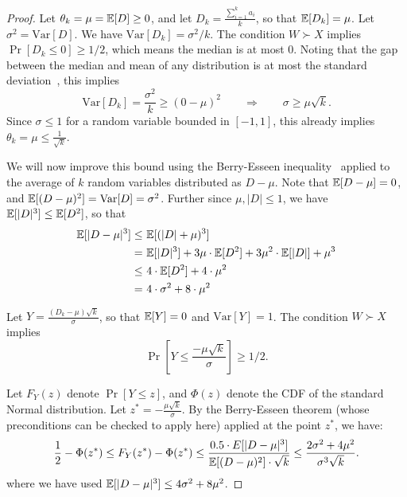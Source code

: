 \begin{proof}
Let $\theta_k = \mu = \mathbb{E}[D] \ge 0$, and let $D_k = \frac{\sum_{i=1}^k a_i}{k}$, so that $\mathbb{E}[D_k] = \mu$. Let $\sigma^2 = \mbox{Var}[D]$.  We have $\mbox{Var}[D_k] = \sigma^2/k$. The condition $W \succ X$ implies $\Pr[D_k \le 0] \ge 1/2$, which means the median is at most $0$. Noting that the gap between the median and mean of any distribution is at most the standard deviation~\cite{MU}, this implies %
$$\mbox{Var}[D_k] = \frac{\sigma^2}{k} \ge (0 - \mu)^2  \qquad \Rightarrow \qquad \sigma \ge \mu \sqrt{k}.$$
Since $\sigma \le 1$ for a random variable bounded in $[-1,1]$, this already implies $\theta_k = \mu \le \frac{1}{\sqrt{k}}$. 

We will now improve this bound using the Berry-Esseen inequality~\cite{feller1971introduction} applied to the average of $k$ random variables distributed as $D - \mu$. Note that $\mathbb{E}[D-\mu] = 0$, and $\mathbb{E}[(D-\mu)^2] = \mbox{Var}[D]= \sigma^2$. Further since $\mu, |D| \le 1$, we have $\mathbb{E}[|D|^3] \le \mathbb{E}[D^2]$, so that
 \begin{align*}
    \mathbb{E}[|D-\mu|^3]  \le & \ \mathbb{E}[(|D| + \mu)^3] \\
     = &\  \mathbb{E}[|D|^3] + 3 \mu \cdot \mathbb{E}[D^2] + 3 \mu^2 \cdot \mathbb{E}[|D|] + \mu^3 \\
     \le &\  4 \cdot \mathbb{E}[D^2] + 4 \cdot \mu^2 \\
    = & \ 4 \cdot \sigma^2 + 8  \cdot \mu^2 
\end{align*} 

Let $Y = \frac{(D_k - \mu) \sqrt{k}}{\sigma}$, so that $\mathbb{E}[Y] = 0$ and $\mbox{Var}[Y] = 1$. The condition $W \succ X$ implies 
$$\Pr\left[Y \le \frac{-\mu \sqrt{k}}{\sigma} \right] \ge 1/2.$$

Let $F_Y(z)$ denote $\Pr[Y \le z]$, and $\Phi(z)$ denote the CDF of the standard Normal distribution.  Let $z^* = -\frac{\mu \sqrt{k}}{\sigma}$.  By the Berry-Esseen theorem  (whose preconditions can be checked to apply here) applied at the point $z^*$, we have:
$$   \frac{1}{2} - \Phi(z^*) \le F_Y(z^*) - \Phi(z^*)  \le \frac{0.5 \cdot E[|D - \mu|^3]}{\mathbb{E}[(D-\mu)^2] \cdot \sqrt{k}} \le  \frac{2 \sigma^2 + 4 \mu^2}{\sigma^3 \sqrt{k}}.$$
where we have used $\mathbb{E}[|D-\mu|^3] \le 4 \sigma^2 + 8 \mu^2$.


\end{proof}
